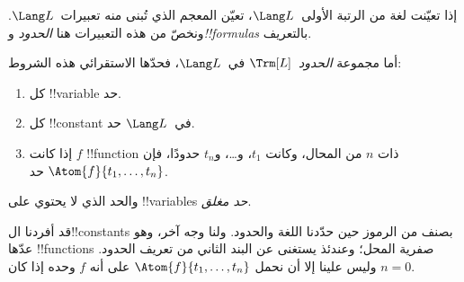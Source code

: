 \documentclass[../../../include/open-logic-section]{subfiles}
\begin{document}


إذا تعيّنت لغة من الرتبة الأولى~$\Lang L$، تعيّن المعجم الذي تُبنى
منه تعبيرات~$\Lang L$. ونخصّ من هذه التعبيرات هنا
\emph{الحدود} و\emph{!!{formula}s} بالتعريف.

\begin{defn}[الحدود]
أما مجموعة \emph{الحدود}~$\Trm[L]$ في~$\Lang L$، فحدّها الاستقرائي
هذه الشروط:
\begin{enumerate}
\item كل !!{variable} حد.
\item كل !!{constant} في~$\Lang L$ حد.
\item إذا كانت $f$ !!{function} ذات $n$ من المحال، وكانت
  $t_1$، و\dots، و$t_n$ حدودًا، فإن
  $\Atom{f}{t_1, \ldots, t_n}$ حد.
\end{enumerate}
والحد الذي لا يحتوي على !!{variable}s \emph{حد مغلق}.
\end{defn}

\begin{explain}
قد أفردنا ال!!{constant}s بصنف من الرموز حين حدّدنا اللغة والحدود.
ولنا وجه آخر، وهو عدّها !!{function}s صفرية المحل؛ وعندئذ يستغنى
عن البند الثاني من تعريف الحدود. وليس علينا إلا أن نحمل $\Atom{f}{t_1, \ldots, t_n}$ على أنه $f$ وحده إذا
كان $n = 0$.
\end{explain}
\end{document}
